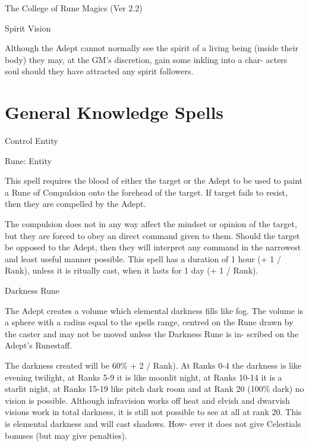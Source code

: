 \begin{Chapter}{The College of Rune Magics (Ver 2.2)}
\begin{talent}[T-2]{Spirit Vision }
\begin{effects}
Although the  Adept cannot  normally  see  the  spirit 
of  a  living  being  (inside  their  body)  they  may,  at 
the GM’s discretion, gain some inkling into a char-
acters  soul  should  they  have  attracted  any  spirit 
followers. 


\end{effects}
\end{talent}

\section{General Knowledge Spells}

\begin{spell}[G-1]{Control Entity }

Rune: Entity 
\begin{effects}
This spell requires the blood of either the target or the Adept to be
used to paint a Rune of Compulsion onto the forehead of the target.
If target fails to resist, then they are compelled by the Adept.

The compulsion does not in any way affect the mindset or opinion of
the target, but they are forced to obey an direct command given to
them.  Should the target be opposed to the Adept, then they will
interpret any command in the narrowest and least useful manner
possible. This spell has a duration of 1 hour (+ 1 / Rank), unless it
is ritually cast, when it lasts for 1 day (+ 1 / Rank).
\end{effects}
\end{spell}

\begin{spell}[G-2]{Darkness Rune }

\begin{effects}
The Adept creates a volume which elemental darkness fills like fog.
The volume is a sphere with a radius equal to the spells range,
centred on the Rune drawn by the caster and may not be moved unless
the Darkness Rune is in- scribed on the Adept’s Runestaff.

The darkness created will be 60\% + 2 / Rank). At 
Ranks  0-4 the  darkness is  like  evening  twilight, at 
Ranks 5-9 it is like moonlit night, at Ranks 10-14 it 
is  a  starlit  night,  at  Ranks  15-19  like  pitch  dark 
room  and  at  Rank  20  (100\%  dark)  no  vision  is 
possible.  Although  infravision  works  off  heat  and 
elvish and dwarvish visions work in total darkness, 
it is still not possible to see at all at rank 20. This is 
elemental  darkness  and  will  cast  shadows.  How-
ever  it  does  not  give  Celestials  bonuses  (but  may 
give penalties). 


\end{effects}
\end{spell}
\end{Chapter}
